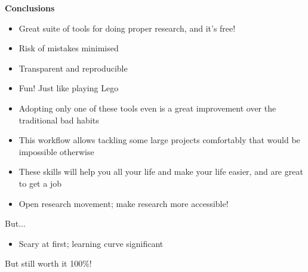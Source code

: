 \documentclass[9pt,xcolor=pdftex,dvipsnames,table]{beamer}
\begin{document}
\begin{frame}{\textbf{Conclusions}}
\begin{itemize}
\item Great suite of tools for doing proper research, and it's free!
\item Risk of mistakes minimised
\item Transparent and reproducible
\item Fun! Just like playing Lego
\item Adopting only one of these tools even is a great improvement
  over the traditional bad habits
\item This workflow allows tackling some large projects comfortably
  that would be impossible otherwise
\item These skills will help you all your life and make your life
  easier, and are great to get a job
\item Open research movement; make research more accessible!
\end{itemize}
But...
\begin{itemize}
\item Scary at first; learning curve significant
\end{itemize}
But still worth it 100\%!
\end{frame}


\end{document}
